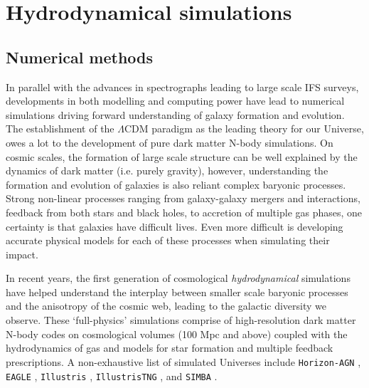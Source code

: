 \section{Hydrodynamical simulations}
\subsection{Numerical methods}
In parallel with the advances in spectrographs leading to large scale IFS surveys, developments in both modelling and computing power have lead to numerical simulations driving forward understanding of galaxy formation and evolution. The establishment of the $\Lambda$CDM paradigm as the leading theory for our Universe, owes a lot to the development of pure dark matter N-body simulations. On cosmic scales, the formation of large scale structure can be well explained by the dynamics of dark matter (i.e. purely gravity), however, understanding the formation and evolution of galaxies is also reliant complex baryonic processes. Strong non-linear processes ranging from galaxy-galaxy mergers and interactions, feedback from both stars and black holes, to accretion of multiple gas phases, one certainty is that galaxies have difficult lives. Even more difficult is developing accurate physical models for each of these processes when simulating their impact.

In recent years, the first generation of cosmological \textit{hydrodynamical} simulations have helped understand the interplay between smaller scale baryonic processes and the anisotropy of the cosmic web, leading to the galactic diversity we observe. These `full-physics' simulations comprise of high-resolution dark matter N-body codes on cosmological volumes (100 Mpc and above) coupled with the hydrodynamics of gas and models for star formation and multiple feedback prescriptions. A non-exhaustive list of simulated Universes include \texttt{Horizon-AGN} \citep{dubois2014}, \texttt{EAGLE} \citep{schaye2015}, \texttt{Illustris} \citep{vogelsberger2014a, vogelsberger2014b, genel2014, sijacki2015}, \texttt{IllustrisTNG} \citep{marinacci18, naiman18, nelson18, pillepich18a, springel18}, and \texttt{SIMBA} \citep{dave2019}. 

